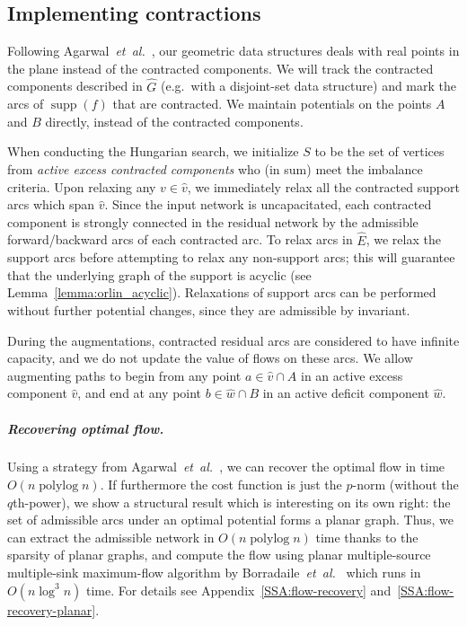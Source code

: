 \documentclass[a4paper,UKenglish]{socg-lipics-v2018}
\makeatletter
\def\etal{\emph{et~al.}}
\def\etal{\textit{et~al.}}
\def\polylog{\mathop{\mathrm{polylog}}}
\def\supp{\operatorname{supp}}
\theoremstyle{plain}
\numberwithin{figure}{section}
\renewcommand{\paragraph}{\subparagraph}
\def\EMPH#1{\textcolor{BrickRed}{{\emph{#1}}}}
\def\n@te#1{\textsf{\boldmath \textbf{$\langle\!\langle$#1$\rangle\!\rangle$}}\leavevmode}
\def\note#1{\textcolor{red}{\n@te{#1}}}
\renewcommand{\note}[1]{} %
\makeatother
\begin{document}
\begin{toappendix}
\subsection{Implementing contractions}
\label{SSA:contraction}

\note{REWRITE}
Following Agarwal~\etal~\cite{AFPVX17}, our geometric data structures deals
with real points in the plane instead of the contracted components.
We will track the contracted components described in $\hat{G}$ (e.g.\ with a
disjoint-set data structure) and mark the arcs of $\supp(f)$ that are
contracted.
We maintain potentials on the points $A$ and $B$ directly, instead of the
contracted components.

When conducting the Hungarian search, we initialize $S$ to be the set of vertices from
\EMPH{active excess contracted components} who (in sum) meet the imbalance
criteria. \note{unclear}
Upon relaxing any $v \in \hat{v}$, we immediately relax all the contracted
support arcs which span $\hat{v}$.
Since the input network is uncapacitated, each contracted component is
strongly connected in the residual network by the admissible forward/backward
arcs of each contracted arc. \note{unparsable}
To relax arcs in $\hat{E}$, we relax the support arcs before attempting to
relax any non-support arcs; this will guarantee that the underlying graph of the support is acyclic (see Lemma~\ref{lemma:orlin_acyclic}).
Relaxations of support arcs can be performed without further potential changes,
since they are admissible by invariant.

During the augmentations, contracted residual arcs are considered to have infinite
capacity, and we do not update the value of flows on these arcs.
We allow augmenting paths to begin from any point $a \in \hat{v} \cap A$ in an active
excess component $\hat{v}$, and end at any point $b \in \hat{w} \cap B$ in an active
deficit component $\hat{w}$.

\end{toappendix}

\paragraph{Recovering optimal flow.}
Using a strategy from Agarwal~\etal~\cite{AFPVX17}, we can recover the optimal
flow in time $O(n\polylog n)$.
%
If furthermore the cost function is just the $p$-norm (without the $q$th-power),
we show a structural result which is interesting on its own right:
the set of admissible arcs under an optimal potential forms a planar graph.
Thus, we can extract the admissible network in $O(n\polylog n)$ time thanks
to the sparsity of planar graphs, and compute the flow using planar
multiple-source multiple-sink maximum-flow algorithm by
Borradaile~\etal~\cite{BKMNW17} which runs in $O(n\log^3 n)$ time.
For details see Appendix~\ref{SSA:flow-recovery} and~\ref{SSA:flow-recovery-planar}.
\end{document}
